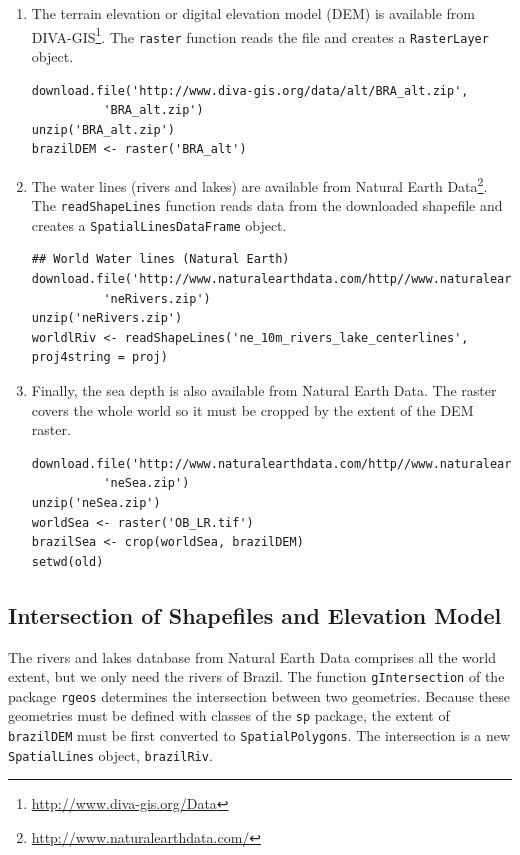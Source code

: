 \documentclass[smallroyalvopaper]{memoir}
\begin{document}
\begin{enumerate}
\item The terrain elevation or digital elevation model (DEM) is
available from DIVA-GIS\footnote{\url{http://www.diva-gis.org/Data}}. The \texttt{raster} function reads the
file and creates a \texttt{RasterLayer} object.
\lstset{language=R,numbers=none}
\begin{lstlisting}
download.file('http://www.diva-gis.org/data/alt/BRA_alt.zip',
	      'BRA_alt.zip')
unzip('BRA_alt.zip')
brazilDEM <- raster('BRA_alt')
\end{lstlisting}
\item The water lines (rivers and lakes) are available from Natural
Earth Data\footnote{\url{http://www.naturalearthdata.com/}}. The \texttt{readShapeLines} function reads data from
the downloaded shapefile and creates a \texttt{SpatialLinesDataFrame}
object.
\lstset{language=R,numbers=none}
\begin{lstlisting}
## World Water lines (Natural Earth)
download.file('http://www.naturalearthdata.com/http//www.naturalearthdata.com/download/10m/physical/ne_10m_rivers_lake_centerlines.zip',
	      'neRivers.zip')
unzip('neRivers.zip')
worldlRiv <- readShapeLines('ne_10m_rivers_lake_centerlines', proj4string = proj)
\end{lstlisting}
\item Finally, the sea depth is also available from Natural Earth
Data\footnotemark[5]{}. The raster covers the whole world so it must be
cropped by the extent of the DEM raster.
\lstset{language=R,numbers=none}
\begin{lstlisting}
download.file('http://www.naturalearthdata.com/http//www.naturalearthdata.com/download/10m/raster/OB_LR.zip',
	      'neSea.zip')
unzip('neSea.zip')
worldSea <- raster('OB_LR.tif')
brazilSea <- crop(worldSea, brazilDEM)
setwd(old)
\end{lstlisting}
\end{enumerate}
\subsection{Intersection of Shapefiles and Elevation Model}
\label{sec-1-2}
The rivers and lakes database from Natural Earth Data comprises all
the world extent, but we only need the rivers of Brazil. The function
\texttt{gIntersection} of the package \texttt{rgeos} determines the intersection
between two geometries. Because these geometries must be defined with
classes of the \texttt{sp} package, the extent of \texttt{brazilDEM} must be first
converted to \texttt{SpatialPolygons}. The intersection is a new
\texttt{SpatialLines} object, \texttt{brazilRiv}.
\end{document}
